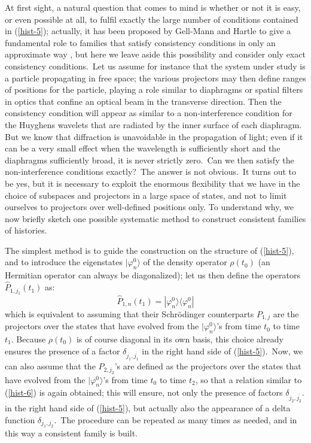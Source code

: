 \documentclass[12pt,onecolumn]{article}%
\begin{document}
At first sight, a natural question that comes to mind is whether or not it is
easy, or even possible at all, to fulfil exactly the large number of
conditions contained in (\ref{hist-5}); actually, it has been proposed by
Gell-Mann and Hartle to give a fundamental role to families that satisfy
consistency conditions in only an approximate way \cite{Gell-Mann}, but here
we leave aside this possibility and consider only exact consistency
conditions.\ Let us assume for instance that the system under study is a
particle propagating in free space; the various projectors may then define
ranges of positions for the particle, playing a role similar to diaphragms or
spatial filters in optics that confine an optical beam in the transverse
direction. Then the consistency condition will appear as similar to a
non-interference condition for the Huyghens wavelets that are radiated by the
inner surface of each diaphragm. But we know that diffraction is unavoidable
in the propagation of light; even if it can be a very small effect when the
wavelength is sufficiently short and the diaphragms sufficiently broad, it is
never strictly zero.\ Can we then satisfy the non-interference conditions
exactly?\ The answer is not obvious.\ It turns out to be yes, but it is
necessary to exploit the enormous flexibility that we have in the choice of
subspaces and projectors in a large space of states, and not to limit
ourselves to projectors over well-defined positions only. To understand why,
we now briefly sketch one possible systematic method to construct consistent
families of histories.

The simplest method is to guide the construction on the structure of
(\ref{hist-5}), and to introduce the eigenstates $|\varphi_{n}^{0}\rangle$ of the
density operator $\rho(t_{0})$ (an Hermitian operator can always be
diagonalized); let us then define the operators $\widehat{P}_{1,j_{1}}(t_{1})$
as:%
\begin{equation}
\widehat{P}_{1,n}(t_{1})=|\varphi_{n}^{0}\rangle \langle\varphi_{n}^{0}|
\label{hist-6}%
\end{equation}
which is equivalent to assuming that their Schr\"{o}dinger counterparts
$P_{1,j}$ are the projectors over the states that have evolved from the
$|\varphi_{n}^{0}\rangle$'s from time $t_{0}$ to time $t_{1}$. Because
$\rho(t_{0})$ is of course diagonal in its own basis, this choice already
ensures the presence of a factor $\delta_{j_{1},j_{1}^{^{\prime}}}$ in the
right hand side of (\ref{hist-5}).\ Now, we can also assume that the
$P_{2,j_{2}}$'s are defined as the projectors over the states that have
evolved from the $|\varphi_{n}^{0}\rangle$'s from time $t_{0}$ to time $t_{2}$,
so that a relation similar to (\ref{hist-6}) is again obtained; this will
ensure, not only the presence of factors $\delta_{j_{2},j_{2}^{^{\prime}}}$.
in the right hand side of (\ref{hist-5}), but actually also the appearance of
a delta function $\delta_{j_{1},j_{2}}$.\ The procedure can be repeated as
many times as needed, and in this way a consistent family is built.
\end{document}
